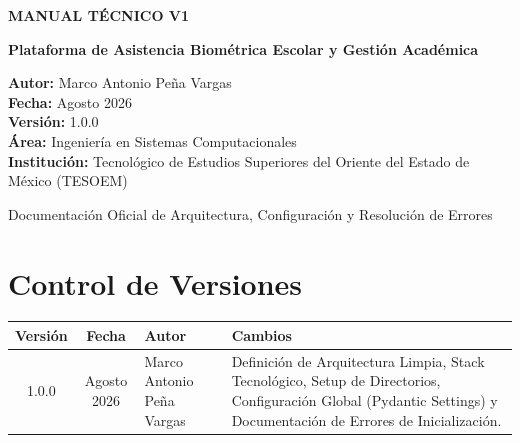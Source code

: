 \documentclass[12pt,a4paper]{article}
\begin{document}
\begin{titlepage}
    \centering
    \vspace*{4cm}
    
    {\Huge \bfseries \color{primary} MANUAL TÉCNICO V1 \par}
    \vspace{1cm}
    {\Large \bfseries Plataforma de Asistencia Biométrica Escolar y Gestión Académica \par}
    
    \vspace{4cm}
    
    \begin{flushleft}
        \large
        \textbf{Autor:} Marco Antonio Peña Vargas \\
        \textbf{Fecha:} Agosto 2026 \\
        \textbf{Versión:} 1.0.0 \\
        \textbf{Área:} Ingeniería en Sistemas Computacionales \\
        \textbf{Institución:} Tecnológico de Estudios Superiores del Oriente del Estado de México (TESOEM)
    \end{flushleft}
    
    \vfill
    {\large Documentación Oficial de Arquitectura, Configuración y Resolución de Errores\par}
\end{titlepage}

\tableofcontents
\newpage

\section*{Control de Versiones}
\begin{table}[h]
    \centering
    \begin{tabularx}{\textwidth}{|c|c|X|X|}
        \hline
        \textbf{Versión} & \textbf{Fecha} & \textbf{Autor} & \textbf{Cambios} \\
        \hline
        1.0.0 & Agosto 2026 & Marco Antonio Peña Vargas & Definición de Arquitectura Limpia, Stack Tecnológico, Setup de Directorios, Configuración Global (Pydantic Settings) y Documentación de Errores de Inicialización. \\
        \hline
    \end{tabularx}
\end{table}

\newpage
\end{document}
